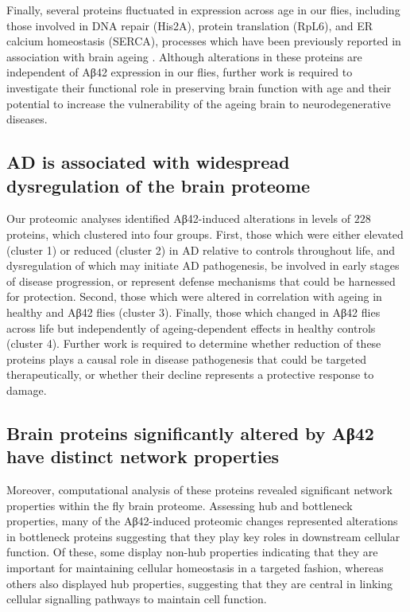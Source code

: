Finally, several proteins fluctuated in expression across age in our flies,
including those involved in DNA repair (His2A), protein translation (RpL6),
and ER calcium homeostasis (SERCA), processes which have been previously reported in
association with brain ageing \cite{Maynard2015,Anisimova2018,Mattson2018}.
Although alterations in these proteins are independent of Aβ42 expression in our flies,
further work is required to investigate their functional role in preserving brain function
with age and their potential to increase the vulnerability of the ageing brain
to neurodegenerative diseases.

\subsection{AD is associated with widespread dysregulation of the brain proteome}

Our proteomic analyses identified Aβ42-induced alterations in levels of $228$ proteins,
which clustered into four groups.
First, those which were either elevated (cluster 1) or reduced (cluster 2) in AD
relative to controls throughout life, and dysregulation of which may initiate
AD pathogenesis, be involved in early stages of disease progression, or represent
defense mechanisms that could be harnessed for protection.
Second, those which were altered in correlation with ageing in healthy and Aβ42 flies
(cluster 3).
Finally, those which changed in Aβ42 flies across life but independently of ageing-dependent
effects in healthy controls (cluster 4).
Further work is required to determine whether reduction of these proteins plays a causal role
in disease pathogenesis that could be targeted therapeutically,
or whether their decline represents a protective response to damage.

\subsection{Brain proteins significantly altered by Aβ42 have distinct network properties}

Moreover, computational analysis of these proteins revealed significant network properties
within the fly brain proteome.
Assessing hub and bottleneck properties, many of the Aβ42-induced proteomic changes
represented alterations in bottleneck proteins suggesting that they play key roles in
downstream cellular function.
Of these, some display non-hub properties indicating that they are important for
maintaining cellular homeostasis in a targeted fashion,
whereas others also displayed hub properties, suggesting that they are central
in linking cellular signalling pathways to maintain cell function.

